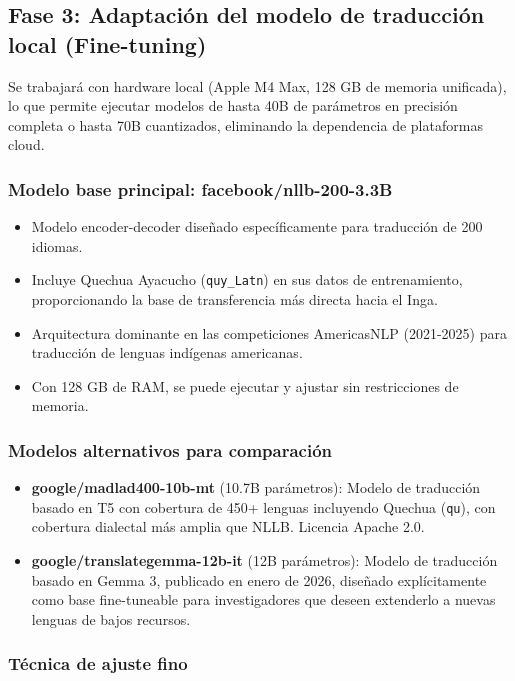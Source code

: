 \documentclass[12pt,a4paper]{article}
\begin{document}
\subsection{Fase 3: Adaptación del modelo de traducción local (Fine-tuning)}

Se trabajará con hardware local (Apple M4 Max, 128 GB de memoria unificada), lo que permite ejecutar modelos de hasta 40B de parámetros en precisión completa o hasta 70B cuantizados, eliminando la dependencia de plataformas cloud.

\subsubsection{Modelo base principal: facebook/nllb-200-3.3B}

\begin{itemize}
    \item Modelo encoder-decoder diseñado específicamente para traducción de 200 idiomas.
    \item Incluye Quechua Ayacucho (\texttt{quy\_Latn}) en sus datos de entrenamiento, proporcionando la base de transferencia más directa hacia el Inga.
    \item Arquitectura dominante en las competiciones AmericasNLP (2021-2025) para traducción de lenguas indígenas americanas.
    \item Con 128 GB de RAM, se puede ejecutar y ajustar sin restricciones de memoria.
\end{itemize}

\subsubsection{Modelos alternativos para comparación}

\begin{itemize}
    \item \textbf{google/madlad400-10b-mt} (10.7B parámetros): Modelo de traducción basado en T5 con cobertura de 450+ lenguas incluyendo Quechua (\texttt{qu}), con cobertura dialectal más amplia que NLLB. Licencia Apache 2.0.

    \item \textbf{google/translategemma-12b-it} (12B parámetros): Modelo de traducción basado en Gemma 3, publicado en enero de 2026, diseñado explícitamente como base fine-tuneable para investigadores que deseen extenderlo a nuevas lenguas de bajos recursos.
\end{itemize}

\subsubsection{Técnica de ajuste fino}
\end{document}
